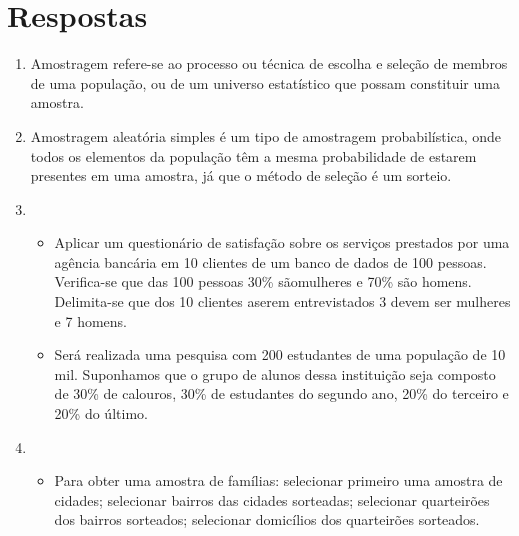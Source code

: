 
 \section*{Respostas}

 \begin{question}
       
    \begin{enumerate}[label={\textbf{\alph*)}}]

        \item 
        
        Amostragem refere-se ao processo ou técnica de escolha e seleção de membros de uma população, 
        ou de um universo estatístico que possam constituir uma amostra.
        \item 
        
        Amostragem aleatória simples é um tipo de amostragem probabilística, onde todos os elementos 
        da população têm a mesma probabilidade de estarem presentes em uma amostra, já que 
        o método de seleção é um sorteio.
        \item 
        
        \begin{itemize}
            \item Aplicar um questionário de satisfação sobre os serviços prestados por uma agência bancária
            em 10 clientes de um banco de dados de 100 pessoas. Verifica-se que das 100 pessoas 30\% sãomulheres
            e  70\%  são  homens.  Delimita-se  que  dos  10  clientes  aserem entrevistados 3 devem ser mulheres e 7 homens.

            \item Será realizada uma pesquisa com 200 estudantes de uma população de 10 mil. Suponhamos que o
            grupo de alunos dessa instituição seja composto de 30\% de calouros, 30\% de estudantes do segundo ano, 20\% do terceiro e 20\% do último.
        \end{itemize}
        \item 
        
        \begin{itemize}
            \item Para obter uma amostra de famílias: selecionar primeiro uma amostra de cidades; selecionar bairros das cidades sorteadas; selecionar
            quarteirões dos bairros sorteados; selecionar domicílios dos quarteirões sorteados.


\end{itemize}
\end{enumerate}
\end{question}
